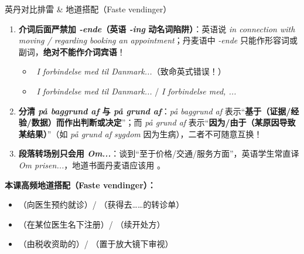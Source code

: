 \begin{grammatikbox}{英丹对比排雷 \& 地道搭配（Faste vendinger）}
\begin{enumerate}
  \item \textbf{介词后面严禁加 \textit{-ende}（英语 \textit{-ing} 动名词陷阱）}：英语说 \textit{in connection with moving / regarding booking an appointment}；丹麦语中 \textit{-ende} 只能作形容词或副词，\textbf{绝对不能作介词宾语}！
    \begin{itemize}
      \item {}\ \textit{I forbindelse med  til Danmark...}（致命英式错误！）
      \item {}\ \textit{I forbindelse med  til Danmark...} / \textit{I forbindelse med, ...}
    \end{itemize}
  \item \textbf{分清 \textit{på baggrund af} 与 \textit{på grund af}}：\textit{på baggrund af} 表示“\textbf{基于（证据/经验/数据）而作出判断或决定}”；而 \textit{på grund af} 表示“\textbf{因为/由于（某原因导致某结果）}”（如 \textit{på grund af sygdom} 因为生病），二者不可随意互换！
  \item \textbf{段落转场别只会用 \textit{Om...}}：谈到“至于价格/交通/服务方面”，英语学生常直译 \textit{Om prisen...}，地道书面丹麦语应该用 。
\end{enumerate}

\textbf{本课高频地道搭配（Faste vendinger）：}
\begin{itemize}
  \item {}（向医生预约就诊）/ （获得去……的转诊单）
  \item {}（在某位医生名下注册）/ （续开处方）
  \item {}（由税收资助的）/ （置于放大镜下审视）
\end{itemize}
\end{grammatikbox}


